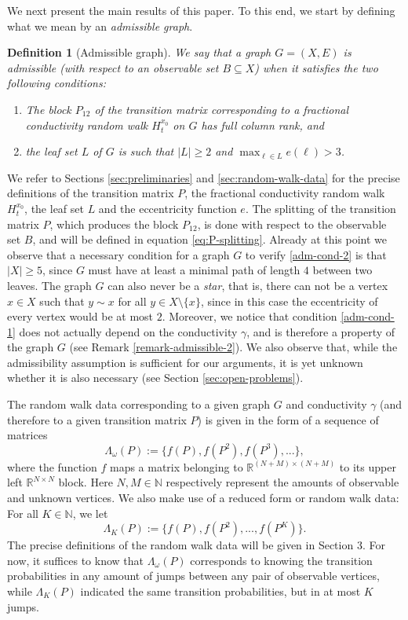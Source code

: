 \documentclass[a4paper,11pt,oneside]{amsart}
\newtheorem{definition}[theorem]{Definition}
\newcommand{\R}{{\mathbb R}}
\newcommand{\N}{{\mathbb N}}
\begin{document}
We next present the main results of this paper. To this end, we start by defining what we mean by an \emph{admissible graph}.

\begin{definition}[Admissible graph]
    We say that a graph $G=(X,E)$ is \emph{admissible (with respect to an observable set $B\subseteq X$)} when it satisfies the two following conditions:
    \begin{enumerate}[label=(A\arabic*)]
        \item \label{adm-cond-1} The block $P_{12}$ of the transition matrix corresponding to a fractional conductivity random walk $H^{x_0}_t$ on $G$ has full column rank, and
        \item \label{adm-cond-2} the leaf set $L$ of $G$ is such that $|L|\geq 2$ and $\max_{\ell \in L}e(\ell) >3$.
    \end{enumerate}
\end{definition}

We refer to Sections \ref{sec:preliminaries} and \ref{sec:random-walk-data} for the precise definitions of the transition matrix $P$, the fractional conductivity random walk $H^{x_0}_t$, the leaf set $L$ and the eccentricity function $e$. The splitting of the transition matrix $P$, which produces the block $P_{12}$, is done with respect to the observable set $B$, and will be defined in equation \eqref{eq:P-splitting}. Already at this point we observe that a necessary condition for a graph $G$ to verify \ref{adm-cond-2} is that $|X|\geq 5$, since $G$ must have at least a minimal path of length $4$ between two leaves. The graph $G$ can also never be a \emph{star}, that is, there can not be a vertex $x\in X$ such that $y\sim x$ for all $y\in X\setminus\{x\}$, since in this case the eccentricity of every vertex would be at most $2$. Moreover, we notice that condition \ref{adm-cond-1} does not actually depend on the conductivity $\gamma$, and is therefore a property of the graph $G$ (see Remark \ref{remark-admissible-2}). We also observe that, while the admissibility assumption is sufficient for our arguments, it is yet unknown whether it is also necessary (see Section \ref{sec:open-problems}).

The random walk data corresponding to a given graph $G$ and conductivity $\gamma$ (and therefore to a given transition matrix $P$) is given in the form of a sequence of matrices $$\Lambda_\omega(P):=\{ f(P), f(P^2), f(P^3), ... \},$$
where the function $f$ maps a matrix belonging to $\R^{(N+M)\times(N+M)}$ to its upper left $\R^{N\times N}$ block. Here $N,M\in\N$ respectively represent the amounts of observable and unknown vertices. We also make use of a reduced form or random walk data: For all $K\in\N$, we let
$$\Lambda_K(P):=\{ f(P), f(P^2), ..., f(P^K)  \}.$$
The precise definitions of the random walk data will be given in Section 3. For now, it suffices to know that $\Lambda_\omega(P)$ corresponds to knowing the transition probabilities in any amount of jumps between any pair of observable vertices, while $\Lambda_K(P)$ indicated the same transition probabilities, but in at most $K$ jumps.
\end{document}
